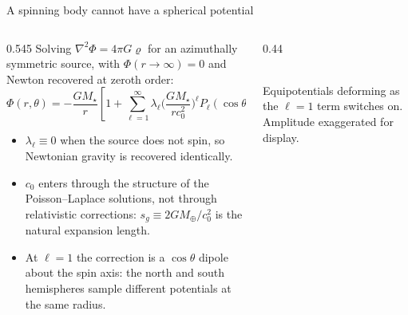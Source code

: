 \documentclass[aspectratio=169,10pt]{beamer}
\newcommand{\sg}{s_g}
\newcommand{\figcap}[1]{{\footnotesize\color{muted} #1}}
\begin{document}
\begin{frame}{A spinning body cannot have a spherical potential}

  \begin{columns}[T]
    \begin{column}{0.545\textwidth}
      \vspace{0.2em}
      Solving $\nabla^2\Phi=4\pi G\varrho$ for an azimuthally symmetric
      source, with $\Phi(r\to\infty)=0$ and Newton recovered at zeroth
      order:
      \[
        \Phi(r,\theta)=-\frac{GM_\star}{r}
        \left[1+\sum_{\ell=1}^{\infty}\lambda_\ell
        \Big(\frac{GM_\star}{rc_0^2}\Big)^{\!\ell}P_\ell(\cos\theta)\right]
      \]

      \footnotesize
      \vspace{0.3em}
      \begin{itemize}\setlength\itemsep{0.42em}
        \item $\lambda_\ell\equiv0$ when the source does not spin, so
              Newtonian gravity is recovered identically.
        \item $c_0$ enters through the structure of the
              Poisson--Laplace solutions, not through relativistic
              corrections: $\sg\equiv2GM_\oplus/c_0^2$ is the natural
              expansion length.
        \item At $\ell=1$ the correction is a $\cos\theta$ dipole about
              the spin axis: the north and south hemispheres sample
              different potentials at the same radius.
      \end{itemize}
    \end{column}
    \begin{column}{0.44\textwidth}
      \begin{center}
        \\[0.3em]
        \figcap{Equipotentials deforming as the $\ell=1$ term switches
        on. Amplitude exaggerated for display.}
      \end{center}
    \end{column}
  \end{columns}

\end{frame}
\end{document}
